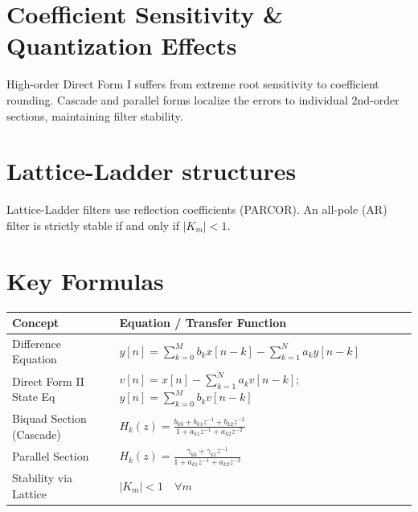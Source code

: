 \documentclass[11pt,a4paper]{article}
\begin{document}
\section{Coefficient Sensitivity \& Quantization Effects}
High-order Direct Form I suffers from extreme root sensitivity to coefficient rounding. Cascade and parallel forms localize the errors to individual 2nd-order sections, maintaining filter stability.

\section{Lattice-Ladder structures}
Lattice-Ladder filters use reflection coefficients (PARCOR). An all-pole (AR) filter is strictly stable if and only if $|K_m| < 1$.

\section{Key Formulas}
\begin{table}[H]
\centering
\begin{tabular}{ll}
\toprule
\textbf{Concept} & \textbf{Equation / Transfer Function} \\
\midrule
Difference Equation & $y[n] = \sum_{k=0}^{M} b_k x[n-k] - \sum_{k=1}^{N} a_k y[n-k]$ \\
Direct Form II State Eq & $v[n] = x[n] - \sum_{k=1}^{N} a_k v[n-k]$; $y[n] = \sum_{k=0}^{M} b_k v[n-k]$ \\
Biquad Section (Cascade) & $H_k(z) = \frac{b_{k0} + b_{k1} z^{-1} + b_{k2} z^{-2}}{1 + a_{k1} z^{-1} + a_{k2} z^{-2}}$ \\
Parallel Section & $H_k(z) = \frac{\gamma_{k0} + \gamma_{k1} z^{-1}}{1 + a_{k1} z^{-1} + a_{k2} z^{-2}}$ \\
Stability via Lattice & $|K_m| < 1 \quad \forall m$ \\
\bottomrule
\end{tabular}
\end{table}
\end{document}

